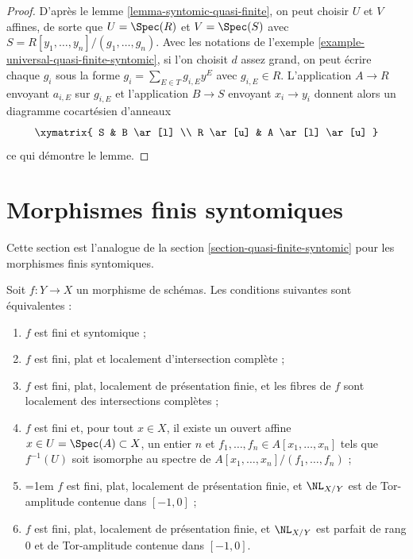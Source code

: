 \begin{proof}
D'après le lemme \ref{lemma-syntomic-quasi-finite},
on peut choisir $U$ et $V$ affines, de sorte que
$U = \Spec(R)$ et $V = \Spec(S)$ avec
$S = R[y_1, \ldots, y_n]/(g_1, \ldots, g_n)$.
Avec les notations de l'exemple \ref{example-universal-quasi-finite-syntomic},
si l'on choisit $d$ assez grand, on peut écrire chaque $g_i$ sous la forme
$g_i = \sum_{E \in T} g_{i, E}y^E$ avec $g_{i, E} \in R$.
L'application $A \to R$ envoyant $a_{i, E}$ sur $g_{i, E}$
et l'application $B \to S$ envoyant $x_i \to y_i$ donnent alors un diagramme cocartésien
d'anneaux
$$
\xymatrix{
S & B \ar[l] \\
R \ar[u] & A \ar[l] \ar[u]
}
$$
ce qui démontre le lemme.
\end{proof}











\section{Morphismes finis syntomiques}
\label{section-finite-syntomic}

\noindent
Cette section est l'analogue de la section \ref{section-quasi-finite-syntomic}
pour les morphismes finis syntomiques.

\begin{lemma}
\label{lemma-syntomic-finite}
Soit $f : Y \to X$ un morphisme de schémas. Les conditions suivantes sont équivalentes :
\begin{enumerate}
\item $f$ est fini et syntomique ;
\item $f$ est fini, plat et localement d'intersection complète ;
\item $f$ est fini, plat, localement de présentation finie,
et les fibres de $f$ sont localement des intersections complètes ;
\item $f$ est fini et, pour tout $x \in X$, il existe un
ouvert affine $x \in U = \Spec(A) \subset X$, un entier $n$
et $f_1, \ldots, f_n \in A[x_1, \ldots, x_n]$ tels que
$f^{-1}(U)$ soit isomorphe au spectre de
$A[x_1, \ldots, x_n]/(f_1, \ldots, f_n)$ ;
\item {\emergencystretch=1em $f$ est fini, plat, localement de présentation finie,
et $\NL_{X/Y}$ est de Tor-amplitude contenue dans $[-1, 0]$ ;\par}
\item $f$ est fini, plat, localement de présentation finie, et
$\NL_{X/Y}$ est parfait de rang $0$ et de Tor-amplitude contenue dans $[-1, 0]$.
\end{enumerate}
\end{lemma}

